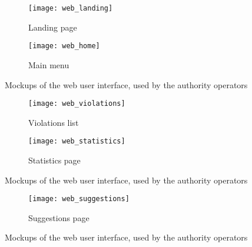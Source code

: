 \begin{figure}[t]
    \centering
    \begin{subfigure}{\textwidth}
        \texttt{[image: web\_landing]}
        \caption{Landing page}
    \end{subfigure}

    \begin{subfigure}{\textwidth}
        \texttt{[image: web\_home]}
        \caption{Main menu}
    \end{subfigure}

    \caption{Mockups of the web user interface, used by the authority operators}
    \label{fig:mockups_web}
\end{figure}
\begin{figure}[t]\ContinuedFloat
    \centering
    \begin{subfigure}{\textwidth}
        \texttt{[image: web\_violations]}
        \caption{Violations list}
    \end{subfigure}
    
    \begin{subfigure}{\textwidth}
        \texttt{[image: web\_statistics]}
        \caption{Statistics page}
    \end{subfigure}

    \caption{Mockups of the web user interface, used by the authority operators}
\end{figure}
\begin{figure}[t]\ContinuedFloat
    \centering
    \begin{subfigure}{\textwidth}
        \texttt{[image: web\_suggestions]}
        \caption{Suggestions page}
    \end{subfigure}

    \caption{Mockups of the web user interface, used by the authority operators}
\end{figure}